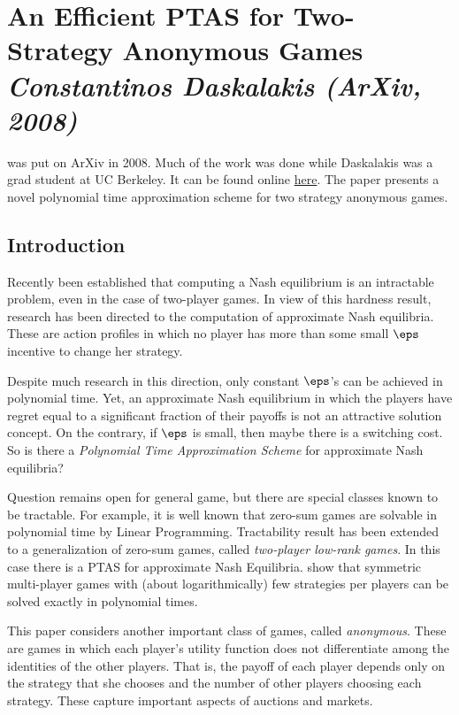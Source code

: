 
\newpage
\section{An Efficient PTAS for Two-Strategy Anonymous Games \textit{\small Constantinos Daskalakis (ArXiv, 2008)}}

\citet{D-2008} was put on ArXiv in 2008. Much of the work was done while Daskalakis was a grad student at UC Berkeley. It can be found online \href{https://arxiv.org/abs/0812.2277}{here}. The paper presents a novel polynomial time approximation scheme for two strategy anonymous games. 

\subsection{Introduction}

Recently been established that computing a Nash equilibrium is an intractable problem, even in the case of two-player games. In view of this hardness result, research has been directed to the computation of approximate Nash equilibria. These are action profiles in which no player has more than some small $\eps$ incentive to change her strategy. 

Despite much research in this direction, only constant $\eps$'s can be achieved in polynomial time. Yet, an approximate Nash equilibrium in which the players have regret equal to a significant fraction of their payoffs is not an attractive solution concept. On the contrary, if $\eps$ is small, then maybe there is a switching cost. So is there a \emph{Polynomial Time Approximation Scheme} for approximate Nash equilibria?

Question remains open for general game, but there are special classes known to be tractable. For example, it is well known that zero-sum games are solvable in polynomial time by Linear Programming. Tractability result has been extended to a generalization of zero-sum games, called \emph{two-player low-rank games}. In this case there is a PTAS for approximate Nash Equilibria. \citet{PR-2005} show that symmetric multi-player games with (about logarithmically) few strategies per players can be solved exactly in polynomial times. 

This paper considers another important class of games, called \emph{anonymous}. These are games in which each player's utility function does not differentiate among the identities of the other players. That is, the payoff of each player depends only on the strategy that she chooses and the number of other players choosing each strategy. These capture important aspects of auctions and markets.

